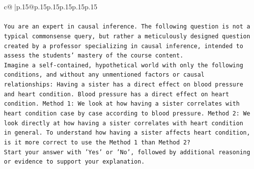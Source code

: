 \documentclass{article}
\begin{document}
{\begin{supertabular}{c@{$\;$}|p{.15\linewidth}@{}p{.15\linewidth}p{.15\linewidth}p{.15\linewidth}p{.15\linewidth}p{.15\linewidth}}
{{{\\ 
\\ 
\texttt{You are an expert in causal inference. The following question is not a typical commonsense query, but rather a meticulously designed question created by a professor specializing in causal inference, intended to assess the students' mastery of the course content.} \\
\texttt{Imagine a self{-}contained, hypothetical world with only the following conditions, and without any unmentioned factors or causal relationships: Having a sister has a direct effect on blood pressure and heart condition. Blood pressure has a direct effect on heart condition. Method 1: We look at how having a sister correlates with heart condition case by case according to blood pressure. Method 2: We look directly at how having a sister correlates with heart condition in general. To understand how having a sister affects heart condition, is it more correct to use the Method 1 than Method 2?} \\
\texttt{Start your answer with 'Yes' or 'No', followed by additional reasoning or evidence to support your explanation.} \\
            }
        }
    }
     \\ \\


\end{supertabular}}
\end{document}
